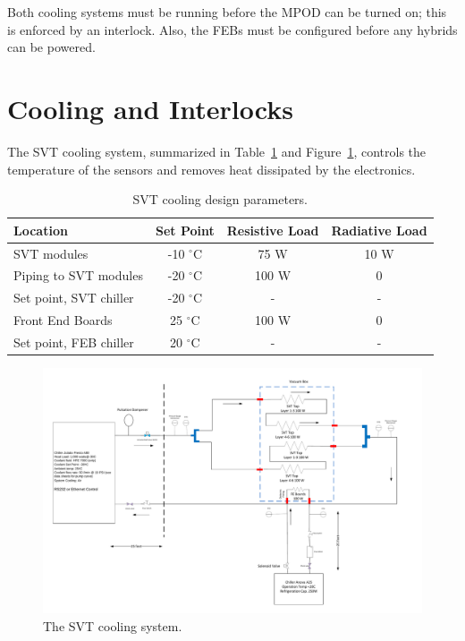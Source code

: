 \documentclass[12pt]{report}
\begin{document}
Both cooling systems must be running before the MPOD can be turned on; this is enforced by an interlock. 
Also, the FEBs must be configured before any hybrids can be powered.

\section{Cooling and Interlocks}
The SVT cooling system, summarized in Table~\ref{tab:cooling} and Figure~\ref{fig:cooling_diagram}, controls the temperature of the sensors and removes heat dissipated by the electronics. 
\begin{table}[ht]
\begin{center}
\begin{tabular}{lccc}   
\hline \hline 
Location & Set Point & Resistive Load & Radiative Load \\      
\hline
SVT modules & -10 $^\circ$C & 75 W & 10 W  \\
Piping to SVT modules & -20 $^\circ$C & 100 W & 0 \\
Set point, SVT chiller & -20 $^\circ$C & - & - \\
Front End Boards & 25 $^\circ$C & 100 W & 0  \\
Set point, FEB chiller & 20 $^\circ$C & - & - \\
 \hline \hline
\end{tabular}
\caption[]{SVT cooling design parameters.}
\label{tab:cooling} 
\end{center}
\end{table}
\begin{figure}[htbp]
\begin{center}
    \includegraphics[width=\textwidth]{cooling_diagram}
\caption{The SVT cooling system.}
\label{fig:cooling_diagram}
\end{center}
\end{figure}
\end{document}
